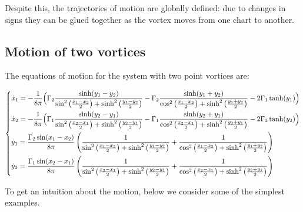 \documentclass[11pt,twoside]{article}
\theoremstyle{definition}
\numberwithin{equation}{section}
\begin{document}
Despite this, the trajectories of motion are globally defined: due to changes in signs they can be glued together as the vortex moves from one chart to another. 
    
    
  
 



\subsection{Motion of two vortices}
    \label{sec:two vortices}

The equations of motion for the system with two point vortices are:
\begin{small}
\begin{equation}
\label{eq:2vorteq}
\begin{split}
    \begin{dcases}
    \dot{x}_1 = -\frac{1}{8\pi}\Big(\Gamma_2\frac{\sinh(y_1-y_2)}{\sin^2\left(\frac{x_1-x_2}{2}\right) + \sinh^2\left(\frac{y_1-y_2}{2}\right)} - \Gamma_2\frac{\sinh(y_1+y_2)}{\cos^2\left(\frac{x_1-x_2}{2}\right) + \sinh^2\left(\frac{y_1+y_2}{2}\right)} - 2\Gamma_1\tanh(y_1)\Big)\\
     \dot{x}_2 = -\frac{1}{8\pi}\Big(\Gamma_1\frac{\sinh(y_2-y_1)}{\sin^2\left(\frac{x_2-x_1}{2}\right) + \sinh^2\left(\frac{y_2-y_1}{2}\right)} - \Gamma_1\frac{\sinh(y_2+y_1)}{\cos^2\left(\frac{x_2-x_1}{2}\right) + \sinh^2\left(\frac{y_2+y_1}{2}\right)} - 2\Gamma_2\tanh(y_2)\Big)\\
     \dot{y}_1 = \frac{\Gamma_2\sin(x_1-x_2)}{8\pi}\left(\frac{1}{\sin^2\left(\frac{x_1-x_2}{2}\right) + \sinh^2\left(\frac{y_1-y_2}{2}\right)} + \frac{1}{\cos^2\left(\frac{x_1-x_2}{2}\right) + \sinh^2\left(\frac{y_1+y_2}{2}\right)}\right)\\
       \dot{y}_2 = \frac{\Gamma_1\sin(x_2-x_1)}{8\pi}\left(\frac{1}{\sin^2\left(\frac{x_2-x_1}{2}\right) + \sinh^2\left(\frac{y_2-y_1}{2}\right)} + \frac{1}{\cos^2\left(\frac{x_2-x_1}{2}\right) + \sinh^2\left(\frac{y_2+y_1}{2}\right)}\right)
    \end{dcases}
\end{split}
\end{equation}
\end{small}
 To get an intuition about the motion, below we consider some of the simplest examples.
 
\end{document}
